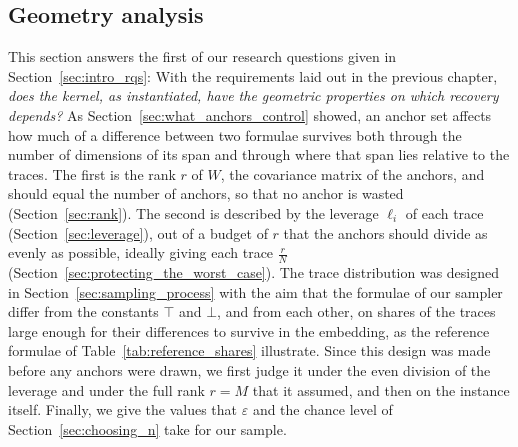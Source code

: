 \documentclass[titlepage,a4paper,11pt]{report}
\begin{document}
    \subsection{Geometry analysis}\label{sec:kernel_geometry}
    This section answers the first of our research questions given in Section~\ref{sec:intro_rqs}: With the requirements laid out in the previous chapter, \textit{does the kernel, as instantiated, have the geometric properties on which recovery depends?} As Section~\ref{sec:what_anchors_control} showed, an anchor set affects how much of a difference between two formulae survives both through the number of dimensions of its span and through where that span lies relative to the traces. The first is the rank $r$ of $W$, the covariance matrix of the anchors, and should equal the number of anchors, so that no anchor is wasted (Section~\ref{sec:rank}). The second is described by the leverage $\ell_i$ of each trace (Section~\ref{sec:leverage}), out of a budget of $r$ that the anchors should divide as evenly as possible, ideally giving each trace $\frac rN$ (Section~\ref{sec:protecting_the_worst_case}). The trace distribution was designed in Section~\ref{sec:sampling_process} with the aim that the formulae of our sampler differ from the constants $\top$ and $\bot$, and from each other, on shares of the traces large enough for their differences to survive in the embedding, as the reference formulae of Table~\ref{tab:reference_shares} illustrate. Since this design was made before any anchors were drawn, we first judge it under the even division of the leverage and under the full rank $r=M$ that it assumed, and then on the instance itself. Finally, we give the values that $\varepsilon$ and the chance level of Section~\ref{sec:choosing_n} take for our sample.
\end{document}
